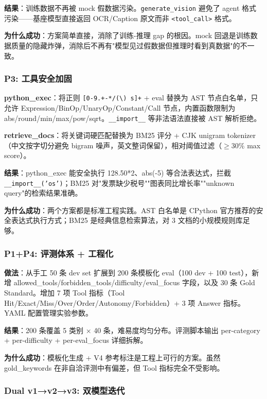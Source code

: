 \documentclass[12pt,a4paper]{ctexart}
\begin{document}
\textbf{结果}：训练数据不再被 mock 假数据污染。\texttt{generate\_vision} 避免了 agent 格式污染——基座模型直接返回 OCR/Caption 原文而非 \texttt{<tool\_call>} 格式。

\textbf{为什么成功}：方案简单直接，消除了训练-推理 gap 的根因。mock 回退是训练数据质量的隐藏炸弹，消除后不再有"模型见过假数据但推理时看到真数据"的不一致。

\subsubsection{P3: 工具安全加固}

\textbf{python\_exec}：将正则 \texttt{[0-9.+-*/(\textbackslash) s]+} + eval 替换为 AST 节点白名单，只允许 Expression/BinOp/UnaryOp/Constant/Call 节点，内置函数限制为 abs/round/min/max/pow/sqrt。\texttt{\_\_import\_\_} 等非法语法直接被 AST 解析拒绝。

\textbf{retrieve\_docs}：将关键词硬匹配替换为 BM25 评分 + CJK unigram tokenizer（中文按字切分避免 bigram 噪声，英文整词保留），相对阈值过滤（$\ge 30\%$ max score）。

\textbf{结果}：python\_exec 能安全执行 128.50*2、abs(-5) 等合法表达式，拦截 \texttt{\_\_import\_\_('os')}；BM25 对"发票缺少税号""图表同比增长率""unknown query"的检索结果准确。

\textbf{为什么成功}：两个方案都是标准工程实践。AST 白名单是 CPython 官方推荐的安全表达式执行方式；BM25 是经典信息检索算法，对 3 文档的小规模规则库足够。

\subsubsection{P1+P4: 评测体系 + 工程化}

\textbf{做法}：从手工 50 条 dev set 扩展到 200 条模板化 eval（100 dev + 100 test），新增 allowed\_tools/forbidden\_tools/difficulty/eval\_focus 字段，以及 30 条 Gold Standard。增加 7 项 Tool 指标（Tool Hit/Exact/Miss/Over/Order/Autonomy/Forbidden）+ 3 项 Answer 指标。YAML 配置管理实验参数。

\textbf{结果}：200 条覆盖 5 类别 × 40 条，难易度均匀分布。评测脚本输出 per-category + per-difficulty + per-eval\_focus 详细拆解。

\textbf{为什么成功}：模板化生成 + V4 参考标注是工程上可行的方案。虽然 gold\_keywords 在非自洽评测中有偏差，但 Tool 指标完全不受影响。

\subsubsection{Dual v1→v2→v3: 双模型迭代}
\end{document}
